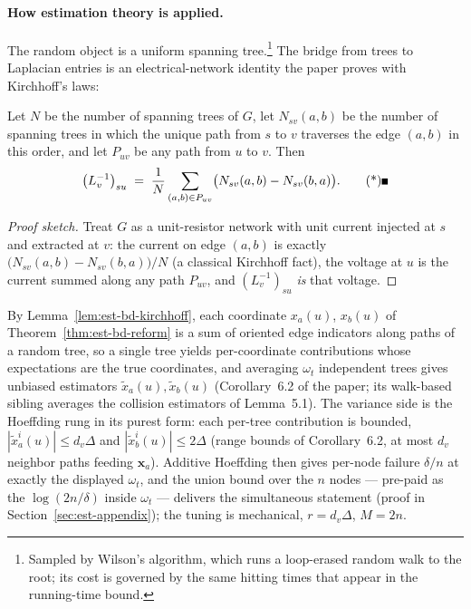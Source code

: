 \paragraph{How estimation theory is applied.}
The random object is a uniform spanning tree.\footnote{Sampled by Wilson's algorithm, which runs a
loop-erased random walk to the root; its cost is governed by the same hitting times that appear in
the running-time bound.} The bridge from trees to Laplacian entries is an electrical-network
identity the paper proves with Kirchhoff's laws:

\begin{lemma}
\label{lem:est-bd-kirchhoff}
Let $N$ be the number of spanning trees of $G$, let $N_{sv}(a,b)$ be the number of spanning trees
in which the unique path from $s$ to $v$ traverses the edge $(a,b)$ in this order, and let
$P_{uv}$ be any path from $u$ to $v$. Then
\[
\bigl(L_v^{-1}\bigr)_{su} \;=\; \frac{1}{N}\sum_{(a,b) \in P_{uv}}
\bigl(N_{sv}(a,b) - N_{sv}(b,a)\bigr). \eopm
\]
\end{lemma}

\begin{proof}[Proof sketch]
Treat $G$ as a unit-resistor network with unit current injected at $s$ and extracted at $v$: the
current on edge $(a,b)$ is exactly $\bigl(N_{sv}(a,b)-N_{sv}(b,a)\bigr)/N$ (a classical
Kirchhoff fact), the voltage at $u$ is the current summed along any path $P_{uv}$, and
$(L_v^{-1})_{su}$ \emph{is} that voltage.
\end{proof}

By Lemma~\ref{lem:est-bd-kirchhoff}, each coordinate $x_a(u)$, $x_b(u)$ of
Theorem~\ref{thm:est-bd-reform} is a sum of oriented edge indicators along paths of a random
tree, so a single tree yields per-coordinate contributions whose expectations are the true
coordinates, and averaging $\omega_t$ independent trees gives unbiased estimators
$\tilde x_a(u), \tilde x_b(u)$ (Corollary~6.2 of the paper; its walk-based sibling averages
the collision estimators of Lemma~5.1). The variance side is the Hoeffding rung in its purest
form: each per-tree contribution is bounded, $|\tilde x_a^i(u)| \le d_v\Delta$ and
$|\tilde x_b^i(u)| \le 2\Delta$ (range bounds of Corollary~6.2, at most $d_v$ neighbor paths
feeding $\mathbf{x}_a$). Additive Hoeffding then gives per-node failure $\delta/n$ at exactly
the displayed $\omega_t$, and the union bound over the $n$ nodes --- pre-paid as the
$\log(2n/\delta)$ inside $\omega_t$ --- delivers the simultaneous statement (proof in
Section~\ref{sec:est-appendix}); the tuning is mechanical, $r = d_v\Delta$, $M = 2n$.

